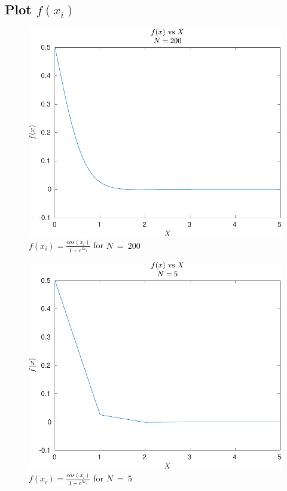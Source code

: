 \documentclass[12pt, a4paper]{article}
\begin{document}
		\subsection{Plot $f(x_{i})$}
			
			
			\begin{figure}[H]
				\centering
				\includegraphics[width=1\linewidth]{Code/Fig/fx_200.pdf}
				\caption{\Large $f(x_{i}) = \frac{cos(x_{i})}{1 + e^{3x_{i}}}$ for $N \ = \ 200$}
				\label{fig:fx200}
			\end{figure}
			
			\begin{figure}[H]
				\centering
				\includegraphics[width=1\linewidth]{Code/Fig/fx_5.pdf}
				\caption{\Large $f(x_{i}) = \frac{cos(x_{i})}{1 + e^{3x_{i}}}$ for $N \ = \ 5$}
				\label{fig:fx5}
			\end{figure}
		
\end{document}
